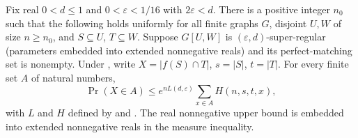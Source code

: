 \begin{lemma}
Fix real $0<d\le1$ and $0<\varepsilon<1/16$ with $2\varepsilon<d$.
There is a positive integer $n_0$ such that the following holds uniformly
for all finite graphs $G$, disjoint $U,W$ of size $n\ge n_0$, and
$S\subseteq U$, $T\subseteq W$. Suppose $G[U,W]$ is
$(\varepsilon,d)$-super-regular (parameters embedded into extended
nonnegative reals) and its perfect-matching set is nonempty.
Under , write $X=|f(S)\cap T|$,
$s=|S|$, $t=|T|$. For every finite set $A$ of natural numbers,
\[
 \Pr(X\in A)\le e^{nL(d,\varepsilon)}\sum_{x\in A}H(n,s,t,x),
\]
with $L$ and $H$ defined by 
and . The real nonnegative upper bound is
embedded into extended nonnegative reals in the measure inequality.
\end{lemma}
